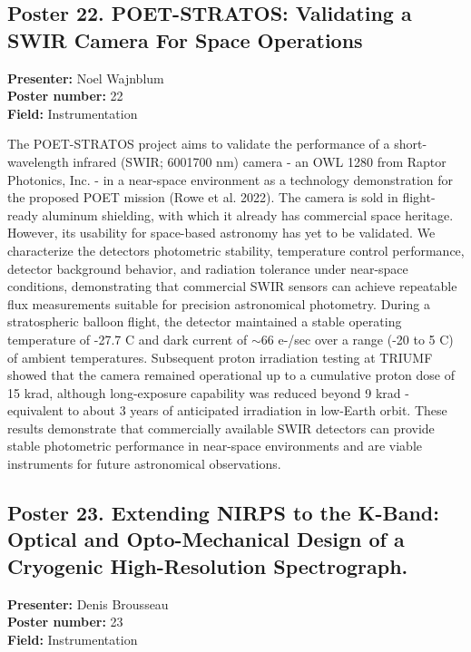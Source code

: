 \hypertarget{poster-abstract-talk-125}{}\label{poster-abstract-page-talk-125}
\subsection*{Poster 22. POET-STRATOS: Validating a SWIR Camera For Space Operations}
\textbf{Presenter:} Noel Wajnblum\\
\textbf{Poster number:} 22\\
\textbf{Field:} Instrumentation

The POET-STRATOS project aims to validate the performance of a short-wavelength infrared (SWIR; 6001700 nm) camera - an OWL 1280 from Raptor Photonics, Inc. - in a near-space environment as a technology demonstration for the proposed POET mission (Rowe et al. 2022). The camera is sold in flight-ready aluminum shielding, with which it already has commercial space heritage. However, its usability for space-based astronomy has yet to be validated. We characterize the detectors photometric stability, temperature control performance, detector background behavior, and radiation tolerance under near-space conditions, demonstrating that commercial SWIR sensors can achieve repeatable flux measurements suitable for precision astronomical photometry. During a stratospheric balloon flight, the detector maintained a stable operating temperature of -27.7 C and dark current of $\sim$66 e-/sec over a range (-20 to 5 C) of ambient temperatures. Subsequent proton irradiation testing at TRIUMF showed that the camera remained operational up to a cumulative proton dose of 15 krad, although long-exposure capability was reduced beyond 9 krad - equivalent to about 3 years of anticipated irradiation in low-Earth orbit. These results demonstrate that commercially available SWIR detectors can provide stable photometric performance in near-space environments and are viable instruments for future astronomical observations.

\hypertarget{poster-abstract-talk-219}{}\label{poster-abstract-page-talk-241}
\subsection*{Poster 23. Extending NIRPS to the K-Band: Optical and Opto-Mechanical Design of a Cryogenic High-Resolution Spectrograph.}
\textbf{Presenter:} Denis Brousseau\\
\textbf{Poster number:} 23\\
\textbf{Field:} Instrumentation

